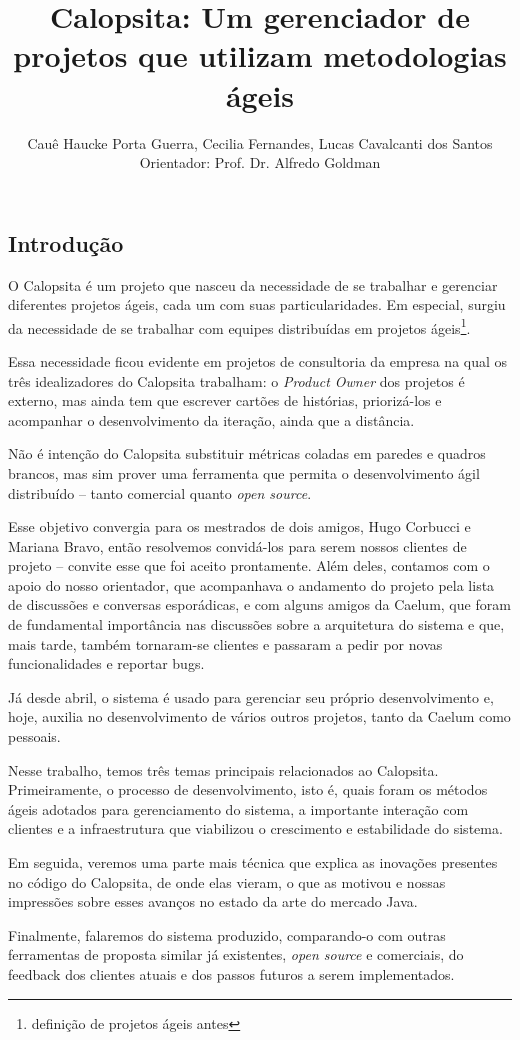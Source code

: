 \documentclass[a2, 12pt]{sciposter}
\title{Calopsita: Um gerenciador de projetos que utilizam metodologias ágeis}
\author{Cauê Haucke Porta Guerra, Cecilia Fernandes, Lucas Cavalcanti dos Santos\\ Orientador: Prof. Dr. Alfredo Goldman}
\institute{Instituto de Matemática e Estatística\\
Universidade de São Paulo}
\newcommand{\calopsita}{Calopsita}
\newcommand{\opensource}{\textit{open source}}
\begin{document}
\renewcommand{\titlesize}{\Huge}
\renewcommand{\authorsize}{\large}
\renewcommand{\instsize}{\small}

\maketitle

\begin{multicols}{2}

\section{Introdução}
O \calopsita{} é um projeto que nasceu da necessidade de se trabalhar e gerenciar diferentes projetos ágeis, cada um com suas particularidades. Em especial, surgiu da necessidade de se trabalhar com equipes distribuídas em projetos ágeis\footnote{definição de projetos ágeis antes}. 

Essa necessidade ficou evidente em projetos de consultoria da empresa na qual os três idealizadores do \calopsita{} trabalham: o \textit{Product Owner}
dos projetos é externo, mas ainda tem que escrever cartões de histórias, priorizá-los e acompanhar o desenvolvimento da iteração, ainda que a distância.

Não é intenção do \calopsita{} substituir métricas coladas em paredes e quadros brancos, mas sim prover uma ferramenta que permita o desenvolvimento ágil distribuído -- tanto comercial quanto \opensource{}.  

Esse objetivo convergia para os mestrados de dois amigos, Hugo Corbucci e Mariana Bravo, então resolvemos convidá-los para serem nossos clientes de projeto -- convite esse que foi aceito prontamente. Além deles, contamos com o apoio do nosso orientador, que acompanhava o andamento do projeto pela lista de discussões e conversas esporádicas, e com alguns amigos da Caelum, que foram de fundamental importância nas discussões sobre a arquitetura do sistema e que, mais tarde, também tornaram-se clientes e passaram a pedir por novas funcionalidades e reportar bugs. 

Já desde abril, o sistema é usado para gerenciar seu próprio desenvolvimento e, hoje, auxilia no desenvolvimento de vários outros projetos, tanto da Caelum como pessoais.

Nesse trabalho, temos três temas principais relacionados ao \calopsita{}. Primeiramente, o processo de desenvolvimento, isto é, quais foram os métodos ágeis adotados para gerenciamento do sistema, a importante interação com clientes e a infraestrutura que viabilizou o crescimento e estabilidade do sistema. 

Em seguida, veremos uma parte mais técnica que explica as inovações presentes no código do \calopsita{}, de onde elas vieram, o que as motivou e nossas impressões sobre esses avanços no estado da arte do mercado Java.

Finalmente, falaremos do sistema produzido, comparando-o com outras ferramentas de proposta similar já existentes, \opensource{} e comerciais, do feedback dos clientes atuais e dos passos futuros a serem implementados.

\end{multicols}
\end{document}
